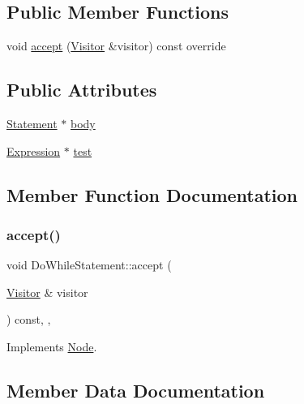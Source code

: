 \subsection*{Public Member Functions}
\begin{DoxyCompactItemize}
\item 
void \hyperlink{struct_do_while_statement_afa4ddac75d1899fa41a134a49aa9c48f}{accept} (\hyperlink{struct_visitor}{Visitor} \&visitor) const override
\end{DoxyCompactItemize}
\subsection*{Public Attributes}
\begin{DoxyCompactItemize}
\item 
\hyperlink{struct_statement}{Statement} $\ast$ \hyperlink{struct_do_while_statement_a1742b816c78d6cfd511e69317461b52a}{body}
\item 
\hyperlink{struct_expression}{Expression} $\ast$ \hyperlink{struct_do_while_statement_acd80c72a8d08b897462572fcce19fa42}{test}
\end{DoxyCompactItemize}


\subsection{Member Function Documentation}
\mbox{\label{struct_do_while_statement_afa4ddac75d1899fa41a134a49aa9c48f}} 
\subsubsection{\texorpdfstring{accept()}{accept()}}
{\footnotesize\ttfamily void Do\+While\+Statement\+::accept (\begin{DoxyParamCaption}\item[{\hyperlink{struct_visitor}{Visitor} \&}]{visitor }\end{DoxyParamCaption}) const\hspace{0.3cm}{\ttfamily [inline]}, {\ttfamily [override]}, {\ttfamily [virtual]}}



Implements \hyperlink{struct_node_a10bd7af968140bbf5fa461298a969c71}{Node}.



\subsection{Member Data Documentation}
\mbox{\label{struct_do_while_statement_a1742b816c78d6cfd511e69317461b52a}} 
